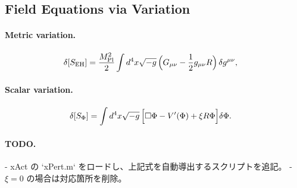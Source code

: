 \subsection{Field Equations via Variation}

\providecommand{\Mpl}{M_{\mathrm{Pl}}} %
\providecommand{\PhiField}{\Phi}

\newcommand{\Var}[1]{\delta\!\left[#1\right]} %

\paragraph{Metric variation.}
\begin{align}
\Var{S_{\text{EH}}}
  &= \frac{\Mpl^{2}}{2} \int d^{4}x\sqrt{-g}\,
     \Bigl(G_{\mu\nu}-\frac12 g_{\mu\nu}R\Bigr)\,\delta g^{\mu\nu},
\end{align}

\paragraph{Scalar variation.}
\begin{align}
\Var{S_{\Phi}}
  &= \int d^{4}x\sqrt{-g}\,
     \Bigl[\Box\PhiField - V'(\PhiField) + \xi R\PhiField\Bigr]\delta\PhiField.
\end{align}

\paragraph{TODO.}  
- xAct の `xPert.m` をロードし、上記式を自動導出するスクリプトを追記。  
- $\xi=0$ の場合は対応箇所を削除。
